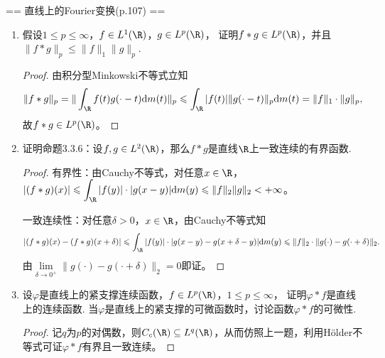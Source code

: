 == 直线上的Fourier变换(p.107) ==
\begin{enumerate}
    \item 假设$1\leqslant p\leqslant\infty$，$f\in L^1(\R)$，$g\in L^p(\R)$，
    证明$f\ast g\in L^p(\R)$，并且$\|f\ast g\|_p\leqslant\|f\|_1\|g\|_p$.
    \begin{proof}
        由积分型Minkowski不等式立知\[\|f\ast g\|_p=\|\int_{\R}f(t)g(\cdot-t){\rm d}m(t)\|_p
        \leqslant\int_{\R}|f(t)|\|g(\cdot-t)\|_p{\rm d}m(t)=\|f\|_1\cdot\|g\|_p,\]
        故$f\ast g\in L^p(\R)$。
    \end{proof}
    \item 证明命题3.3.6：设$f,g\in L^2(\R)$，那么$f\ast g$是直线$\R$上一致连续的有界函数.
    \begin{proof}
        有界性：由Cauchy不等式，对任意$x\in\R$，$|(f\ast g)(x)|\leqslant\displaystyle
        \int_{\R}|f(y)|\cdot|g(x-y)|{\rm d}m(y)\leqslant\|f\|_2\|g\|_2<+\infty$。

        一致连续性：对任意$\delta>0$，$x\in\R$，由Cauchy不等式知
        \[|(f\ast g)(x)-(f\ast g)(x+\delta)|\leqslant\int_{\R}|f(y)|\cdot|g(x-y)-g(x+\delta-y)|{\rm d}m(y)
        \leqslant\|f\|_2\cdot\|g(\cdot)-g(\cdot+\delta)\|_2.\]由$\lim\limits_{\delta\to0^+}\|g(\cdot)-g(\cdot+\delta)\|_2=0$即证。
    \end{proof}
    \item 设$\varphi$是直线上的紧支撑连续函数，$f\in L^p(\R)$，$1\leqslant p\leqslant\infty$，
    证明$\varphi\ast f$是直线上的连续函数. 当$\varphi$是直线上的紧支撑的可微函数时，讨论函数$\varphi\ast f$的可微性.
    \begin{proof}
        记$q$为$p$的对偶数，则$C_c(\R)\subseteq L^q(\R)$，从而仿照上一题，利用H\"older不等式可证$\varphi\ast f$有界且一致连续。


\end{proof}
\end{enumerate}
